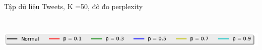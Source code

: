 \documentclass[pdf]{beamer}
\begin{document}
\begin{frame}{Tập dữ liệu Tweets, K =50, đô đo perplexity}
\begin{columns}[T] %
	\begin{column}{.50\textwidth}
		\begin{figure}
		\end{figure}
	\end{column} %
	\hfill%
	\begin{column}{.50\textwidth}
		\begin{figure}
		\end{figure}				
	\end{column} %
\end{columns}
\begin{center}
	\includegraphics[width=1\textwidth]{menu.png}	
\end{center}
\end{frame}
\end{document}
